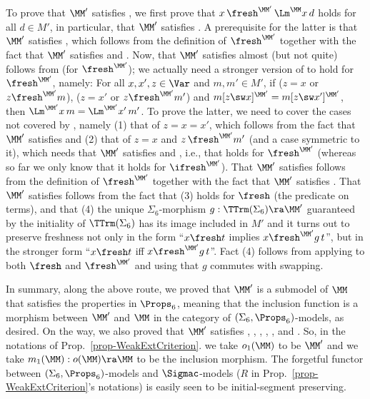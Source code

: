 		To prove that $\MM'$ satisfies \FrLm{}, we first prove that $x \,\fresh^{\MM'}\, \Lm^{\MM}x\,d$ holds for all $d\in M'$, in particular, that $\MM'$ satisfies \FCB{}.  
		A prerequisite for the latter is that 
		$\MM'$ satisfies \FrSw{}, which 
		follows from the definition of $\fresh^{\MM'}$ together 
		with the fact that $\MM'$ satisfies \SwCp{} and \SwIv{}. 
		Now, that $\MM'$ satisfies \FrLm{}  almost (but not quite) follows 
		from 
		\SwCg{} (for $\fresh^{\MM'}$); we actually need a stronger version of \SwCg{} to hold for $\fresh^{\MM'}$, namely: For all $x,x',z\in\Var$ and $m,m'\in M'$, if ($z=x$ or $z\fresh^{\MM'} m$), ($z=x'$ or $z\fresh^{\MM'} m'$) 
		and $m[z \sw x]^{\MM'} = m[z \sw x']^{\MM'} $, then $\Lm^{\MM'}x\,m = \Lm^{\MM'}x'\,m'$. 
		To prove the latter, we need to cover the cases not covered by \SwCg{}, namely 
		(1) that of $z=x=x'$, which follows from the fact that $\MM'$ satisfies \SwId{} and 
		(2) that of $z =x$ and $z\,\fresh^{\MM'} m'$ (and a case symmetric to it), 
		which needs that $\MM'$ satisfies 
		\SwFr{} and 
		\FrDSw{}, i.e., that \FrDSw{} holds for $\fresh^{\MM'}$ 
		(whereas so far we only know that it holds for $\ifresh^{\MM'}$). 
		That $\MM'$ satisfies 
		\SwFr{} follows from the definition of $\fresh^{\MM'}$ together 
		with the fact that $\MM'$ satisfies \SwCp{}. 
		That $\MM'$ satisfies 
		\FrDSw{} follows from the fact that (3) \FrDSw{} holds for
		$\fresh$ (the predicate on terms), and that (4) the unique $\Sigma_6$-morphism $g: \TTrm(\Sigma_6) \ra \MM'$ guaranteed by the initiality of $\TTrm(\Sigma_6)$ 
		has its image included in $M'$ and it turns out to preserve freshness not only in the form ``$x\fresh t$ implies $x\fresh^{\MM'}g\,t$'', but in the stronger form 
		``$x\fresh t$ iff $x\fresh^{\MM'}g\,t$''.  Fact (4) follows from applying 
		\FrDSw{} to both $\fresh$ and $\fresh^{\MM'}$ and using that $g$ commutes with swapping. 
		
		In summary, along the above route, we proved that $\MM'$ is a submodel of $\MM$ that satisfies the properties in $\Props_6$, meaning that the inclusion function is a morphism between $\MM'$ and $\MM$ in the category of $(\Sigma_6,\Props_6)$-models, as desired. On the way, we also proved that 
		$\MM'$ satisfies \FCB{}, \SwIv{}, \SwId{}, \SwCp{}, \FrSw{}, \SwFr{} and 
		\FvDSw{}. %
		So, in the notations of Prop.~\ref{prop-WeakExtCriterion}. we take $o_1(\MM)$ to be $\MM'$ and we take $m_1(\MM): o(\MM) \ra \MM$ to be the inclusion morphism.  The forgetful functor between $(\Sigma_6,\Props_6)$-models and $\Sigmac$-models ($R$ in Prop.~\ref{prop-WeakExtCriterion}'s notations) is easily seen to be initial-segment preserving. 
		
